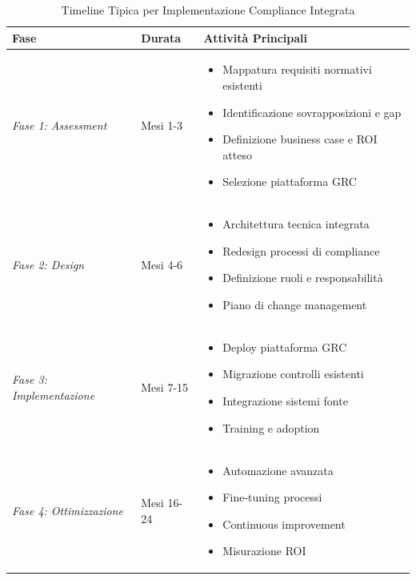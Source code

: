 \begin{table}[htbp]
\centering
\caption{Timeline Tipica per Implementazione Compliance Integrata}
\label{tab:timeline}
\begin{tabular}{l l p{8cm}}
\toprule
\textbf{Fase} & \textbf{Durata} & \textbf{Attività Principali} \\
\midrule
\textit{Fase 1: Assessment} & Mesi 1-3 & 
\begin{itemize}[leftmargin=*, topsep=0pt, itemsep=0pt]
\item Mappatura requisiti normativi esistenti
\item Identificazione sovrapposizioni e gap
\item Definizione business case e ROI atteso
\item Selezione piattaforma GRC
\end{itemize} \\
\midrule
\textit{Fase 2: Design} & Mesi 4-6 & 
\begin{itemize}[leftmargin=*, topsep=0pt, itemsep=0pt]
\item Architettura tecnica integrata
\item Redesign processi di compliance
\item Definizione ruoli e responsabilità
\item Piano di change management
\end{itemize} \\
\midrule
\textit{Fase 3: Implementazione} & Mesi 7-15 & 
\begin{itemize}[leftmargin=*, topsep=0pt, itemsep=0pt]
\item Deploy piattaforma GRC
\item Migrazione controlli esistenti
\item Integrazione sistemi fonte
\item Training e adoption
\end{itemize} \\
\midrule
\textit{Fase 4: Ottimizzazione} & Mesi 16-24 & 
\begin{itemize}[leftmargin=*, topsep=0pt, itemsep=0pt]
\item Automazione avanzata
\item Fine-tuning processi
\item Continuous improvement
\item Misurazione ROI
\end{itemize} \\
\bottomrule
\end{tabular}
\end{table}